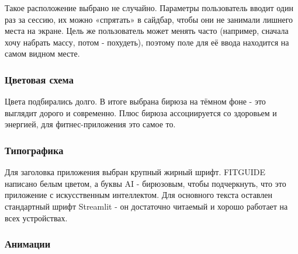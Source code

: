 \documentclass[14pt, a4paper]{extarticle}
\begin{document}
\begin{enumerate}
\noindent Такое расположение выбрано не случайно. Параметры пользователь вводит один раз за сессию, их можно «спрятать» в сайдбар, чтобы они не занимали лишнего места на экране. Цель же пользователь может менять часто (например, сначала хочу набрать массу, потом - похудеть), поэтому поле для её ввода находится на самом видном месте.

\subsubsection{Цветовая схема}

\noindent Цвета подбирались долго. В итоге выбрана бирюза на тёмном фоне - это выглядит дорого и современно. Плюс бирюза ассоциируется со здоровьем и энергией, для фитнес-приложения это самое то.


\subsubsection{Типографика}

\noindent Для заголовка приложения выбран крупный жирный шрифт. FITGUIDE написано белым цветом, а буквы AI - бирюзовым, чтобы подчеркнуть, что это приложение с искусственным интеллектом. Для основного текста оставлен стандартный шрифт Streamlit - он достаточно читаемый и хорошо работает на всех устройствах.

\subsubsection{Анимации}


\end{enumerate}
\end{document}
